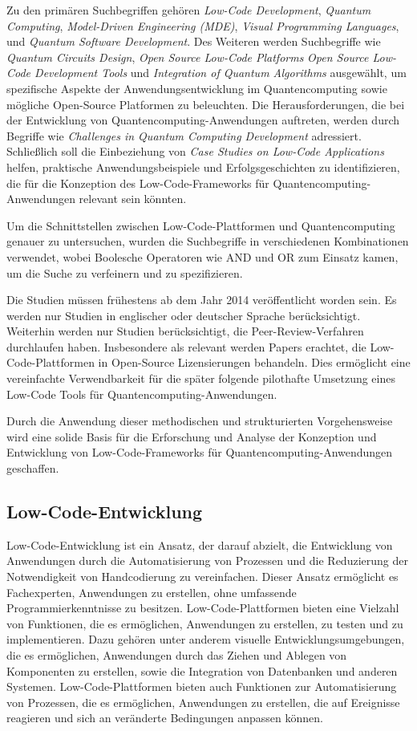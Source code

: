 Zu den primären Suchbegriffen gehören 
\textit{Low-Code Development}, \textit{Quantum Computing}, \textit{Model-Driven Engineering (MDE)}, 
\textit{Visual Programming Languages}, und \textit{Quantum Software Development}. Des Weiteren 
werden Suchbegriffe wie \textit{Quantum Circuits Design}, \textit{Open Source Low-Code Platforms} 
\textit{Open Source Low-Code Development Tools} und
\textit{Integration of Quantum Algorithms} ausgewählt, um spezifische Aspekte der 
Anwendungsentwicklung im Quantencomputing sowie mögliche Open-Source Platformen 
zu beleuchten. Die Herausforderungen, die bei 
der Entwicklung von Quantencomputing-Anwendungen auftreten, werden durch Begriffe wie 
\textit{Challenges in Quantum Computing Development} adressiert. Schließlich soll die 
Einbeziehung von \textit{Case Studies on Low-Code Applications} helfen, praktische Anwendungsbeispiele 
und Erfolgsgeschichten zu identifizieren, die für die Konzeption des Low-Code-Frameworks für 
Quantencomputing-Anwendungen relevant sein könnten.

Um die Schnittstellen zwischen Low-Code-Plattformen und Quantencomputing genauer zu untersuchen, 
wurden die Suchbegriffe in verschiedenen Kombinationen verwendet, wobei Boolesche Operatoren wie 
AND und OR zum Einsatz kamen, um die Suche zu verfeinern und zu spezifizieren.

Die Studien müssen frühestens ab dem Jahr 2014 
veröffentlicht worden sein. Es werden nur Studien in englischer oder deutscher 
Sprache berücksichtigt. Weiterhin werden nur Studien berücksichtigt, die Peer-Review-Verfahren 
durchlaufen haben. Insbesondere als relevant werden Papers erachtet, die Low-Code-Plattformen 
in Open-Source Lizensierungen behandeln. Dies ermöglicht eine vereinfachte Verwendbarkeit für 
die später folgende pilothafte Umsetzung eines Low-Code Tools für Quantencomputing-Anwendungen.

Durch die Anwendung dieser 
methodischen und strukturierten Vorgehensweise wird eine solide Basis für die Erforschung 
und Analyse der Konzeption und Entwicklung von Low-Code-Frameworks für 
Quantencomputing-Anwendungen geschaffen.

\subsection{Low-Code-Entwicklung}
Low-Code-Entwicklung ist ein Ansatz, der darauf abzielt, die Entwicklung von Anwendungen
durch die Automatisierung von Prozessen und die Reduzierung der Notwendigkeit von
Handcodierung zu vereinfachen. Dieser Ansatz ermöglicht es Fachexperten, Anwendungen
zu erstellen, ohne umfassende Programmierkenntnisse zu besitzen. Low-Code-Plattformen
bieten eine Vielzahl von Funktionen, die es ermöglichen, Anwendungen zu erstellen, zu
testen und zu implementieren. Dazu gehören unter anderem visuelle Entwicklungsumgebungen,
die es ermöglichen, Anwendungen durch das Ziehen und Ablegen von Komponenten zu erstellen,
sowie die Integration von Datenbanken und anderen Systemen. Low-Code-Plattformen bieten
auch Funktionen zur Automatisierung von Prozessen, die es ermöglichen, Anwendungen zu
erstellen, die auf Ereignisse reagieren und sich an veränderte Bedingungen anpassen können.

